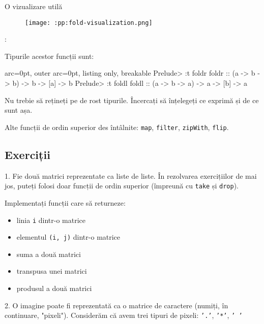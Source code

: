 O vizualizare utilă

\begin{figure}[!htb]
\centering
\texttt{[image: :pp:fold-visualization.png]}
\end{figure}
:


Tipurile acestor funcții sunt:


\begin{tcblisting}{ arc=0pt, outer arc=0pt, listing only, breakable}
Prelude> :t foldr
foldr :: (a -> b -> b) -> b -> [a] -> b
Prelude> :t foldl
foldl :: (a -> b -> a) -> a -> [b] -> a

\end{tcblisting}


\begin{tcolorbox}[colback=cyan!5, colframe=cyan!10, breakable]
Nu trebie să rețineți pe de rost tipurile. Încercați să înțelegeți ce exprimă și de ce sunt așa.
\end{tcolorbox}

Alte funcții de ordin superior des întâlnite: \texttt{map}, \texttt{filter}, \texttt{zipWith}, \texttt{flip}.


\subsection*{ Exerciții }

1. Fie două matrici reprezentate ca liste de liste. În rezolvarea exercițiilor de mai jos, puteți folosi doar funcții de ordin superior (împreună cu \texttt{take} și \texttt{drop}).

Implementați funcții care să returneze:

\begin{itemize}
	\item  linia \texttt{i} dintr-o matrice
	\item  elementul \texttt{(i, j)} dintr-o matrice
	\item  suma a două matrici
	\item  transpusa unei matrici 
	\item  produsul a două matrici
\end{itemize}


2. O imagine poate fi reprezentată ca o matrice de caractere (numiți, în continuare, "pixeli"). Considerăm că avem trei tipuri de pixeli: \texttt{'.'}, \texttt{'*'}, \texttt{' '}


